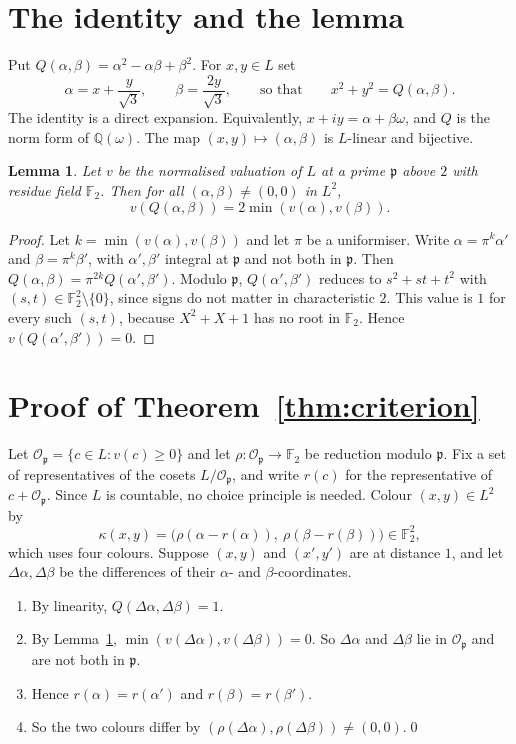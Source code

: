 \documentclass[11pt,a4paper]{amsart}
\newtheorem{lemma}[theorem]{Lemma}
\theoremstyle{remark}
\newcommand{\F}{\mathbb{F}}
\newcommand{\Q}{\mathbb{Q}}
\newcommand{\p}{\mathfrak{p}}
\newcommand{\Op}{\mathcal{O}_{\mathfrak{p}}}
\begin{document}
\section{The identity and the lemma}

Put $Q(\alpha,\beta)=\alpha^2-\alpha\beta+\beta^2$. For $x,y\in L$ set
\[
\alpha=x+\frac{y}{\sqrt3},\qquad \beta=\frac{2y}{\sqrt3},\qquad\text{so that}\qquad x^2+y^2=Q(\alpha,\beta).
\]
The identity is a direct expansion. Equivalently, $x+iy=\alpha+\beta\omega$, and $Q$ is the norm form of
$\Q(\omega)$. The map $(x,y)\mapsto(\alpha,\beta)$ is $L$-linear and bijective.

\begin{lemma}\label{lem:valuation}
Let $v$ be the normalised valuation of $L$ at a prime $\p$ above $2$ with residue field $\F_2$. Then for all
$(\alpha,\beta)\ne(0,0)$ in $L^2$,
\[
v(Q(\alpha,\beta))=2\min(v(\alpha),v(\beta)).
\]
\end{lemma}

\begin{proof}
Let $k=\min(v(\alpha),v(\beta))$ and let $\pi$ be a uniformiser. Write $\alpha=\pi^k\alpha'$ and
$\beta=\pi^k\beta'$, with $\alpha',\beta'$ integral at $\p$ and not both in $\p$. Then
$Q(\alpha,\beta)=\pi^{2k}Q(\alpha',\beta')$. Modulo $\p$, $Q(\alpha',\beta')$ reduces to $s^2+st+t^2$ with
$(s,t)\in\F_2^2\setminus\{0\}$, since signs do not matter in characteristic $2$. This value is $1$ for every
such $(s,t)$, because $X^2+X+1$ has no root in $\F_2$. Hence $v(Q(\alpha',\beta'))=0$.
\end{proof}

\section{Proof of Theorem~\ref{thm:criterion}}

Let $\Op=\{c\in L: v(c)\ge0\}$ and let $\rho\colon\Op\to\F_2$ be reduction modulo $\p$. Fix a set of
representatives of the cosets $L/\Op$, and write $r(c)$ for the representative of $c+\Op$. Since $L$ is
countable, no choice principle is needed. Colour $(x,y)\in L^2$ by
\[
\kappa(x,y)=\bigl(\rho(\alpha-r(\alpha)),\ \rho(\beta-r(\beta))\bigr)\in\F_2^2,
\]
which uses four colours. Suppose $(x,y)$ and $(x',y')$ are at distance $1$, and let $\Delta\alpha,\Delta\beta$
be the differences of their $\alpha$- and $\beta$-coordinates.
\begin{enumerate}
\item By linearity, $Q(\Delta\alpha,\Delta\beta)=1$.
\item By Lemma~\ref{lem:valuation}, $\min(v(\Delta\alpha),v(\Delta\beta))=0$. So $\Delta\alpha$ and
$\Delta\beta$ lie in $\Op$ and are not both in $\p$.
\item Hence $r(\alpha)=r(\alpha')$ and $r(\beta)=r(\beta')$.
\item So the two colours differ by $(\rho(\Delta\alpha),\rho(\Delta\beta))\ne(0,0)$.\qed
\end{enumerate}
\end{document}
